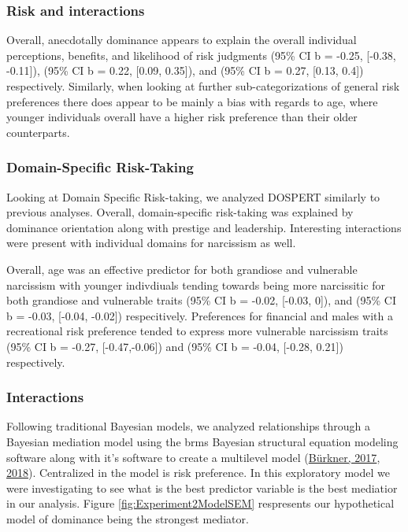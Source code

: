 \documentclass[
  donotrepeattitle,doc, 12pt, a4paper,floatsintext]{apa7}
\begin{document}
\hypertarget{risk-and-interactions}{%
\subsubsection{Risk and interactions}\label{risk-and-interactions}}

Overall, anecdotally dominance appears to explain the overall individual perceptions, benefits, and likelihood of risk judgments (95\% CI b = -0.25, {[}-0.38, -0.11{]}), (95\% CI b = 0.22, {[}0.09, 0.35{]}), and (95\% CI b = 0.27, {[}0.13, 0.4{]}) respectively. Similarly, when looking at further sub-categorizations of general risk preferences there does appear to be mainly a bias with regards to age, where younger individuals overall have a higher risk preference than their older counterparts.

\hypertarget{domain-specific-risk-taking-1}{%
\subsubsection{Domain-Specific Risk-Taking}\label{domain-specific-risk-taking-1}}

Looking at Domain Specific Risk-taking, we analyzed DOSPERT similarly to previous analyses. Overall, domain-specific risk-taking was explained by dominance orientation along with prestige and leadership. Interesting interactions were present with individual domains for narcissism as well.

Overall, age was an effective predictor for both grandiose and vulnerable narcissism with younger indivdiuals tending towards being more narcissitic for both grandiose and vulnerable traits (95\% CI b = -0.02, {[}-0.03, 0{]}), and (95\% CI b = -0.03, {[}-0.04, -0.02{]}) respecitively. Preferences for financial and males with a recreational risk preference tended to express more vulnerable narcissism traits (95\% CI b = -0.27, {[}-0.47,-0.06{]}) and (95\% CI b = -0.04, {[}-0.28, 0.21{]}) respectively.

\hypertarget{interactions-1}{%
\subsubsection{Interactions}\label{interactions-1}}

Following traditional Bayesian models, we analyzed relationships through a Bayesian mediation model using the brms Bayesian structural equation modeling software along with it's software to create a multilevel model (\protect\hyperlink{ref-burkner2017}{Bürkner, 2017}, \protect\hyperlink{ref-burkner2018}{2018}). Centralized in the model is risk preference. In this exploratory model we were investigating to see what is the best predictor variable is the best mediatior in our analysis. Figure \ref{fig:Experiment2ModelSEM} respresents our hypothetical model of dominance being the strongest mediator.
\end{document}
